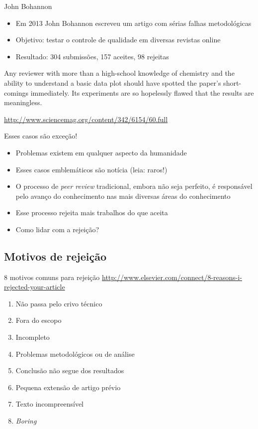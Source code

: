 \documentclass{beamer}
\begin{document}
\begin{frame}{John Bohannon}
  \begin{itemize}
  \item Em 2013 John Bohannon escreveu um artigo com sérias falhas
    metodológicas
  \item Objetivo: testar o controle de qualidade em diversas revistas
    online
  \item Resultado: 304 submissões, 157 aceites, 98 rejeitas
  \end{itemize}
  \begin{block}{}
    Any reviewer with more than a high-school knowledge of chemistry
    and the ability to understand a basic data plot should have
    spotted the paper's short-comings immediately. Its experiments are
    so hopelessly flawed that the results are meaningless.
  \end{block}
  \url{http://www.sciencemag.org/content/342/6154/60.full}
\end{frame}

\begin{frame}{Esses casos são exceção!}
  \begin{itemize}
  \item Problemas existem em qualquer aspecto da humanidade
  \item Esses casos emblemáticos são notícia (leia: raros!)
  \item O processo de {\em peer review} tradicional, embora não seja
    perfeito, é responsável pelo avanço do conhecimento nas mais
    diversas áreas do conhecimento
  \item Esse processo rejeita mais trabalhos do que aceita
  \item Como lidar com a rejeição?
  \end{itemize}
\end{frame}

\subsection{Motivos de rejeição}

\begin{frame}{8 motivos comuns para rejeição}
  \url{http://www.elsevier.com/connect/8-reasons-i-rejected-your-article}
  \begin{enumerate}
  \item<1-> Não passa pelo crivo técnico
  \item<1-> Fora do escopo
  \item<1-> Incompleto
  \item<1-> Problemas metodológicos ou de análise
  \item<1-> Conclusão não segue dos resultados
  \item<1-> Pequena extensão de artigo prévio
  \item<1-> Texto incompreensível
  \item<1-> {\em Boring}
  \end{enumerate}
\end{frame}
\end{document}
